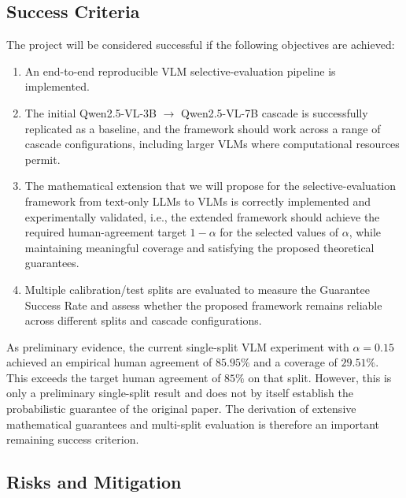 \documentclass[11pt,a4paper]{article}
\begin{document}
\subsection{Success Criteria}

The project will be considered successful if the following objectives are
achieved:

\begin{enumerate}[leftmargin=*]
    \item An end-to-end reproducible VLM selective-evaluation pipeline is implemented.

    \item The initial Qwen2.5-VL-3B $\rightarrow$ Qwen2.5-VL-7B cascade
    is successfully replicated as a baseline, and the framework should
    work across a range of cascade configurations, including larger VLMs
    where computational resources permit.

    \item The mathematical extension that we will propose for the
    selective-evaluation framework from text-only LLMs to VLMs is
    correctly implemented and experimentally validated, i.e., the
    extended framework should achieve the required human-agreement target
    $1-\alpha$ for the selected values of $\alpha$, while maintaining
    meaningful coverage and satisfying the proposed theoretical
    guarantees.

    \item Multiple calibration/test splits are evaluated to measure the
    Guarantee Success Rate and assess whether the proposed framework
    remains reliable across different splits and cascade configurations.

\end{enumerate}

As preliminary evidence, the current single-split VLM experiment with
$\alpha=0.15$ achieved an empirical human agreement of $85.95\%$ and a
coverage of $29.51\%$. This exceeds the target human agreement of $85\%$ on
that split. However, this is only a preliminary single-split result and
does not by itself establish the probabilistic guarantee of the original
paper. The derivation of extensive mathematical guarantees and multi-split evaluation is therefore an important remaining
success criterion.

\subsection{Risks and Mitigation}
\end{document}
